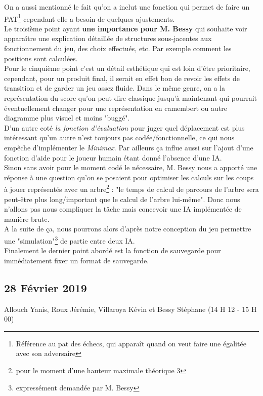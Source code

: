 \documentclass[11pt,a4paper]{article}
\begin{document}
On a aussi mentionné le fait qu'on a inclut une fonction qui permet de faire un PAT\footnote{Référence au pat des échecs, qui apparaît quand on veut faire une égalitée avec son adversaire} cependant elle a besoin de quelques ajustements.\\
Le troisième point ayant \textbf{une importance pour M. Bessy} qui souhaite voir apparaître une explication détaillée de structures sous-jacentes aux fonctionnement du jeu, des choix effectués, etc. Par exemple comment les positions sont calculées.\\
Pour le cinquième point c'est un détail esthétique qui est loin d'être prioritaire, cependant, pour un produit final, il serait en effet bon de revoir les effets de transition et de garder un jeu assez fluide. Dans le même genre, on a la représentation du score qu'on peut dire classique jusqu'à maintenant qui pourrait éventuellement changer pour une représentation en camembert ou autre diagramme plus visuel et moins "buggé".\\
D'un autre coté \textit{la fonction d'évaluation} pour juger quel déplacement est plus intéressant qu'un autre n'est toujours pas codée/fonctionnelle, ce qui nous empêche d'implémenter le \textit{Minimax}.
Par ailleurs ça influe aussi sur l'ajout d'une fonction d'aide pour le joueur humain étant donné l'absence d'une IA.\\
Sinon sans avoir pour le moment codé le nécessaire, M. Bessy nous a apporté une réponse à une question qu'on se posaient pour optimiser les calculs sur les coups à jouer représentés avec un arbre\footnote{pour le moment d'une hauteur maximale théorique 3} : "le temps de calcul de parcours de l'arbre sera peut-être plus long/important que le calcul de l'arbre lui-même". Donc nous n'allons pas nous compliquer la tâche mais concevoir une IA implémentée de manière brute.\\
A la suite de ça, nous pourrons alors d'après notre conception du jeu permettre une "simulation"\footnote{expressément demandée par M. Bessy} de partie entre deux IA.\\
Finalement le dernier point abordé est la fonction de sauvegarde pour immédiatement fixer un format de sauvegarde.


\newpage
\subsection{28 Février 2019}
Allouch Yanis, Roux Jérémie, Villaroya Kévin et Bessy Stéphane (14 H 12 - 15 H 00)\\
\end{document}
